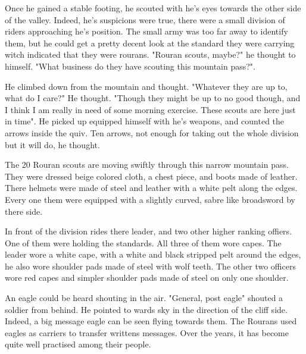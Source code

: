 Once he gained a stable footing, he scouted with he's eyes towards the other side of the valley. Indeed, he's suspicions were true, there were a small division of riders approaching he's position. The small army was too far away to identify them, but he could get a pretty decent look at the standard they were carrying witch indicated that they were rourans. "Rouran scouts, maybe?" he thought to himself. "What business do they have scouting this mountain pass?".

He climbed down from the mountain and thought. "Whatever they are up to, what do I care?" He thought. "Though they might be up to no good though, and I think I am really in need of some morning exercise. These scouts are here just in time". He picked up equipped himself with he's weapons, and counted the arrows inside the quiv. Ten arrows, not enough for taking out the whole division but it will do, he thought.

\newsect

The 20 Rouran scouts are moving swiftly through this narrow mountain pass. They were dressed beige colored cloth, a chest piece, and boots made of leather. There helmets were made of steel and leather with a white pelt along the edges. Every one them were equipped with a slightly curved, sabre like broadsword by there side.

In front of the division rides there leader, and two other higher ranking offiers. One of them were holding the standards. All three of them wore capes. The leader wore a white cape, with a white and black stripped pelt around the edges, he also wore shoulder pads made of steel with wolf teeth. The other two officers wore red capes and simpler shoulder pads made of steel on only one shoulder.

An eagle could be heard shouting in the air.
"General, post eagle" shouted a soldier from behind. He pointed to wards sky in the direction of the cliff side. Indeed, a big message eagle can be seen flying towards them. The Rourans used eagles as carriers to transfer writtens messages. Over the years, it has become quite well practised among their people.
